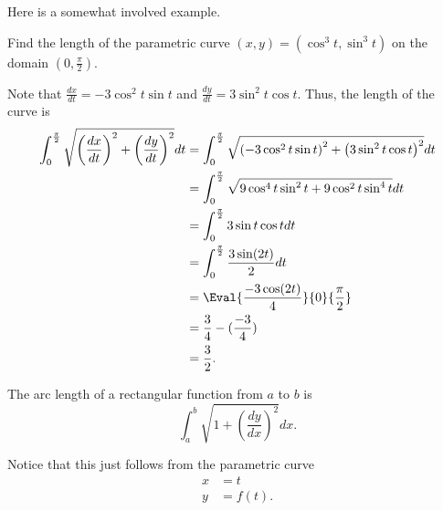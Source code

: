 \documentclass{article}
\begin{document}
\begin{center}
\end{center}

Here is a somewhat involved example.

\begin{exam}
Find the length of the parametric curve $(x,y)=(\cos^3t,\sin^3t)$ on the domain $(0,\frac{\pi}{2})$.
\end{exam}

\begin{sol}
Note that $\frac{dx}{dt}=-3\cos^2t\sin t$ and $\frac{dy}{dt}=3\sin^2t\cos t$. Thus, the length of the curve is
\begin{align*}
\int_{0}^{\frac{\pi}{2}}\sqrt{\left(\frac{dx}{dt}\right)^2+\left(\frac{dy}{dt}\right)^2}dt&=\int_{0}^{\frac{\pi}{2}}\sqrt{\left(-3\cos^2t\sin t\right)^2+\left(3\sin^2t\cos t\right)^2}dt \\
&=\int_{0}^{\frac{\pi}{2}}\sqrt{9\cos^4t\sin^2t+9\cos^2t\sin^4t}dt \\
&=\int_{0}^{\frac{\pi}{2}}3\sin t\cos tdt \\
&=\int_{0}^{\frac{\pi}{2}}\frac{3\sin(2t)}{2}dt \\
&=\Eval{\frac{-3\cos(2t)}{4}}{0}{\frac{\pi}{2}} \\
&=\frac{3}{4}-(\frac{-3}{4}) \\
&=\frac{3}{2}.
\end{align*}
\end{sol}

\begin{theo}
The arc length of a rectangular function from $a$ to $b$ is
\[\int_a^b \sqrt{1+\left(\frac{dy}{dx}\right)^2}dx.\]
\end{theo}

Notice that this just follows from the parametric curve
\begin{align*}
x&=t \\
y&=f(t).
\end{align*}
\end{document}
